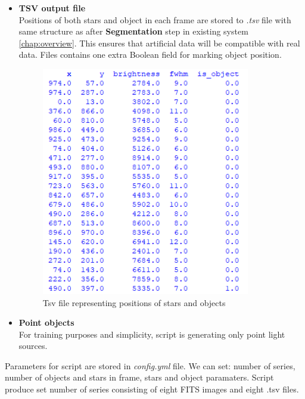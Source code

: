 \begin{itemize}
    \item \textbf{TSV output file}\\
    Positions of both stars and object in each frame are stored to \textit{.tsv} file with same structure as after \textbf{Segmentation} step in existing system \ref{chap:overview}. This ensures that artificial data will be compatible with real data.
    Files contains one extra Boolean field for marking object position.
    
    
    \begin{figure}[!h]
    \centering
    \includegraphics[height=100mm]{chapters/images/tsv_file.PNG}
    \caption{Tsv file representing positions of stars and objects}
    \label{fig:tsv_file_data_generator}
    \end{figure}
    
    \item \textbf{Point objects}\\
    For training purposes and simplicity, script is generating only point light sources.
    
\end{itemize}

Parameters for script are stored in \textit{config.yml} file. We can set: number of series, number of objects and stars in frame, stars and object paramaters. Script produce set number of series consisting of eight FITS images and eight .tsv files.






 


